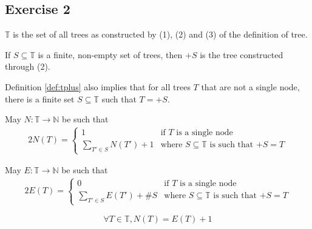 \subsection{Exercise 2}
\begin{definition}
	$\mathbb{T}$ is the set of all trees as constructed by (1), (2) and (3) of the definition of tree.
\end{definition}
\begin{definition}[Operator $+S$]
\label{def:tplus}
	If $S\subseteq\mathbb{T}$ is a finite, non-empty set of trees, then $+S$ is the tree constructed through (2).
\end{definition}
\begin{remark}
	Definition \ref{def:tplus} also implies that for all trees $T$ that are not a single node, there is a finite set $S\subseteq\mathbb{T}$ such that $T=+S$.
\end{remark}
\begin{definition}
	May $N\colon\mathbb{T}\rightarrow\mathbb{N}$ be such that
	\begin{alignat*}{2}
		N(T)= \begin{cases}
			  1                          & \text{if $T$ is a single node}\\
			  \sum_{T' \in S}{N(T')} + 1 & \text{where $S\subseteq\mathbb{T}$ is such that $+S=T$} 
			  \end{cases}
	\end{alignat*}
\end{definition}
\begin{definition}
	May $E\colon\mathbb{T}\rightarrow\mathbb{N}$ be such that
	\begin{alignat*}{2}
		E(T)= \begin{cases}
			  0                            & \text{if $T$ is a single node}\\
			  \sum_{T' \in S}{E(T')} + \#S & \text{where $S\subseteq\mathbb{T}$ is such that $+S=T$} 
			  \end{cases}
	\end{alignat*}
\end{definition}
\begin{theorem}
\begin{equation*}
\forall T \in \mathbb{T}, N(T)=E(T)+1
\end{equation*}
\end{theorem}
